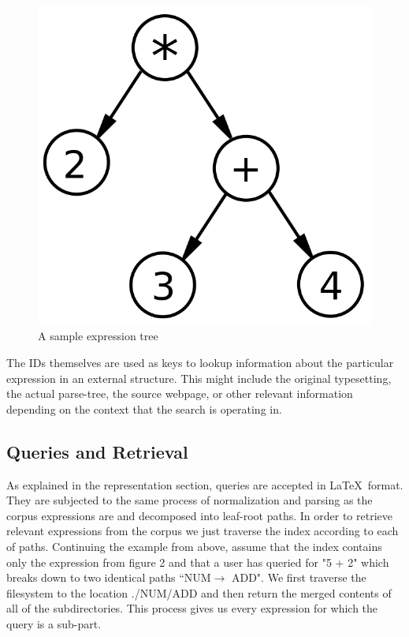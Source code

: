 \documentclass{sig-alternate}
\begin{document}
\begin{figure}
    \label{fig2}
	\centering
    \includegraphics[scale=0.2]{exprtree}
	\caption{A sample expression tree}
\end{figure}

The IDs themselves are used as keys to lookup information about the particular expression in an external structure. This might include the original typesetting, the actual parse-tree, the source webpage, or other relevant information depending on the context that the search is operating in.

\subsection{Queries and Retrieval}
As explained in the representation section, queries are accepted in \LaTeX\, format. They 
are subjected to the same process of normalization and parsing as the corpus expressions
are and decomposed into leaf-root paths. In order to retrieve relevant expressions from the corpus
we just traverse the index according to each of paths. Continuing the example from above, assume that
the index contains only the expression from figure 2 and that a user has queried for "5 + 2" which 
breaks down to two identical paths ``NUM$\rightarrow$ ADD". We first traverse the filesystem to the location
./NUM/ADD and then return the merged contents of all of the subdirectories. This process gives us every expression for which the query is a sub-part. 
\end{document}
